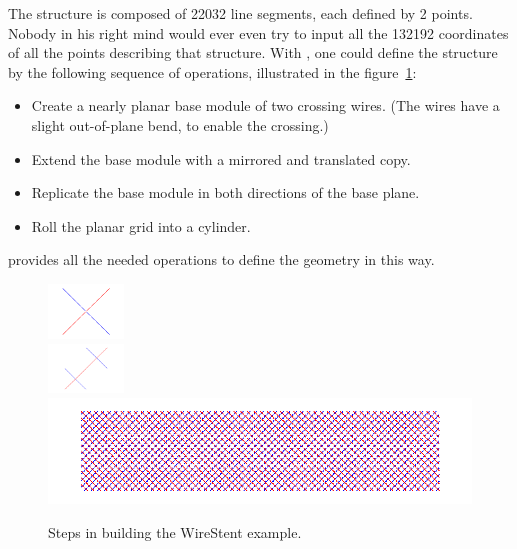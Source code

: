 The structure is composed of 22032 line segments, each defined by 2 points. Nobody in his right mind would ever even try to input all the 132192 coordinates of all the points describing that structure. 
With \pyformex, one could define the structure by the following sequence of operations, illustrated in the figure~\ref{fig:WireStent-steps}:
 \begin{itemize}
 \item Create a nearly planar base module of two crossing wires. (The wires have a slight out-of-plane bend, to enable the crossing.) 
 \item Extend the base module with a mirrored and translated copy.
 \item Replicate the base module in both directions of the base plane.
 \item Roll the planar grid into a cylinder.
 \end{itemize}
\pyf provides all the needed operations to define the geometry in this way.
 \begin{figure}[ht]
   \centering
   \begin{makeimage}
   \end{makeimage}
   \begin{latexonly}
     \includegraphics[width=2cm]{images/wirestent-1}\\
     \includegraphics[width=2cm]{images/wirestent-2}\\
     \includegraphics[width=12cm]{images/wirestent-3}
   \end{latexonly}
   \begin{htmlonly}
   \end{htmlonly}  
   \caption{Steps in building the WireStent example.}   \label{fig:WireStent-steps}

 \end{figure}



